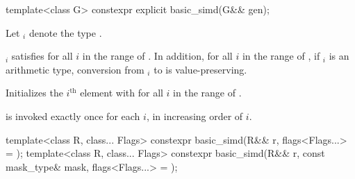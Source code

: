 \begin{itemdecl}
template<class G> constexpr explicit basic_simd(G&& gen);
\end{itemdecl}

\begin{itemdescr}
\pnum
Let $_i$ denote the type
.

\pnum
\constraints
{}$_i$ satisfies  for all $i$ in
the range of .
In addition, for all $i$ in the range of , if $_i$
is an arithmetic type, conversion from $_i$ to 
is value-preserving.

\pnum
\effects
Initializes the $i^\text{th}$ element with
 for all $i$ in the range of .

\pnum
\remarks
{} is invoked exactly once for each $i$, in increasing order of $i$.
\end{itemdescr}

\begin{itemdecl}
template<class R, class... Flags>
  constexpr basic_simd(R&& r, flags<Flags...> = {});
template<class R, class... Flags>
  constexpr basic_simd(R&& r, const mask_type& mask, flags<Flags...> = {});
\end{itemdecl}


